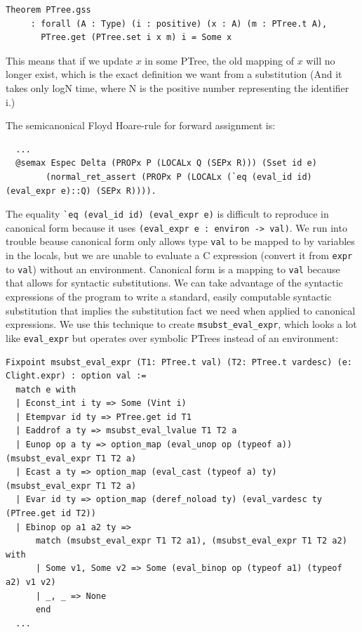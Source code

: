 \documentclass{puthesis}
\begin{document}
\begin{lstlisting}
Theorem PTree.gss
     : forall (A : Type) (i : positive) (x : A) (m : PTree.t A),
       PTree.get (PTree.set i x m) i = Some x
\end{lstlisting}

This means that if we update $x$ in some PTree, the old mapping of $x$
will no longer exist, which is the exact definition we want from a
substitution (And it takes only logN time, where N is the positive
number representing the identifier i.)

The semicanonical Floyd Hoare-rule for forward assignment is:

\begin{lstlisting}
  ...
  @semax Espec Delta (PROPx P (LOCALx Q (SEPx R))) (Sset id e) 
        (normal_ret_assert (PROPx P (LOCALx (`eq (eval_id id) (eval_expr e)::Q) (SEPx R)))).
\end{lstlisting}

The equality \lstinline|`eq (eval_id id) (eval_expr e)| is difficult to
reproduce in canonical form because it uses 
\lstinline|(eval_expr e : environ -> val)|. 
We run into trouble beause canonical form only
allows type \lstinline|val| to be mapped to by variables in the
locals, but we are unable to evaluate a C expression (convert it from
\lstinline|expr| to \lstinline|val|) without an environment. Canonical
form is a mapping to \lstinline|val| because that allows for syntactic
substitutions. We can take advantage of the syntactic expressions of
the program to write a standard, easily computable syntactic
substitution that implies the substitution fact we need when applied
to canonical expressions. We use this technique to create
\lstinline|msubst_eval_expr|, which looks a lot like
\lstinline|eval_expr| but operates over symbolic PTrees instead of an
environment:

\begin{lstlisting}
Fixpoint msubst_eval_expr (T1: PTree.t val) (T2: PTree.t vardesc) (e: Clight.expr) : option val :=
  match e with
  | Econst_int i ty => Some (Vint i)
  | Etempvar id ty => PTree.get id T1
  | Eaddrof a ty => msubst_eval_lvalue T1 T2 a 
  | Eunop op a ty => option_map (eval_unop op (typeof a)) (msubst_eval_expr T1 T2 a) 
  | Ecast a ty => option_map (eval_cast (typeof a) ty) (msubst_eval_expr T1 T2 a)
  | Evar id ty => option_map (deref_noload ty) (eval_vardesc ty (PTree.get id T2))
  | Ebinop op a1 a2 ty =>
      match (msubst_eval_expr T1 T2 a1), (msubst_eval_expr T1 T2 a2) with
      | Some v1, Some v2 => Some (eval_binop op (typeof a1) (typeof a2) v1 v2) 
      | _, _ => None
      end
  ...
\end{lstlisting}
\end{document}
